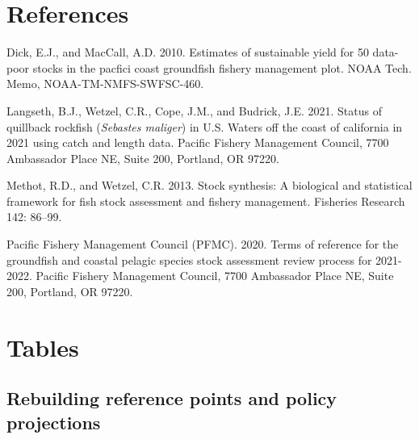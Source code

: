 \documentclass[11pt,
  english,
  letterpaper,
]{article}
\begin{document}

\hypertarget{references}{%
\section{References}\label{references}}

\leavevmode\tagmcend\tagstructend


\hypertarget{refs}{}
\leavevmode\hypertarget{ref-DickandMacCall_dbsra_2010}{}%
Dick, E.J., and MacCall, A.D. 2010. Estimates of sustainable yield for 50 data-poor stocks in the pacfici coast groundfish fishery management plot. NOAA Tech. Memo, NOAA-TM-NMFS-SWFSC-460.

\leavevmode\hypertarget{ref-Langseth_status_2021}{}%
Langseth, B.J., Wetzel, C.R., Cope, J.M., and Budrick, J.E. 2021. Status of quillback rockfish (\emph{Sebastes maliger}) in U.S. Waters off the coast of california in 2021 using catch and length data. Pacific Fishery Management Council, 7700 Ambassador Place NE, Suite 200, Portland, OR 97220.

\leavevmode\hypertarget{ref-methot_stock_2013}{}%
Methot, R.D., and Wetzel, C.R. 2013. Stock synthesis: A biological and statistical framework for fish stock assessment and fishery management. Fisheries Research 142: 86--99.

\leavevmode\hypertarget{ref-TOR_2020}{}%
Pacific Fishery Management Council (PFMC). 2020. Terms of reference for the groundfish and coastal pelagic species stock assessment review process for 2021-2022. Pacific Fishery Management Council, 7700 Ambassador Place NE, Suite 200, Portland, OR 97220.

\leavevmode\tagmcend\tagstructend

\clearpage


\hypertarget{tables}{%
\section{Tables}\label{tables}}

\leavevmode\tagmcend\tagstructend


\hypertarget{rebuilding-reference-points-and-policy-projections}{%
\subsection{Rebuilding reference points and policy projections}\label{rebuilding-reference-points-and-policy-projections}}
\end{document}
